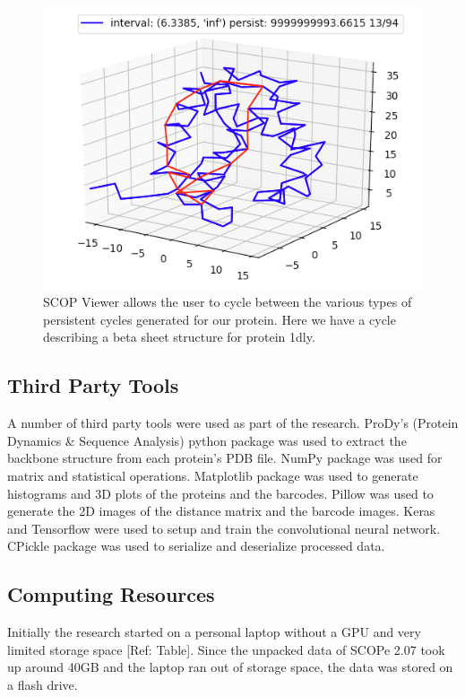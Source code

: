 \documentclass[12pt, a4paper, twocolumn, fullpage]{article}
\theoremstyle{plain}
\theoremstyle{definition}
\theoremstyle{remark}
\begin{document}
\begin{figure}
    \includegraphics[width=\linewidth]{img/scopviewer/scopviewer2}
    \caption{SCOP Viewer allows the user to cycle between the various types of persistent cycles generated for our protein. Here we have a cycle describing a beta sheet structure for protein 1dly. }
    \label{}
\end{figure}

\subsection{Third Party Tools}
A number of third party tools were used as part of the research. ProDy's (Protein Dynamics \& Sequence Analysis) python package was used to extract the backbone structure from each protein's PDB file. NumPy package was used for matrix  and statistical operations. Matplotlib package was used to generate histograms and 3D plots of the proteins and the barcodes. Pillow was used to generate the 2D images of the distance matrix and the barcode images. Keras and Tensorflow were used to setup and train the convolutional neural network. CPickle package was used to serialize and deserialize processed data.
\subsection{Computing Resources}
Initially the research started on a personal laptop without a GPU and very limited storage space [Ref: Table]. Since the unpacked data of SCOPe 2.07 took up around 40GB and the laptop ran out of storage space, the data was stored on a flash drive. 
\end{document}
